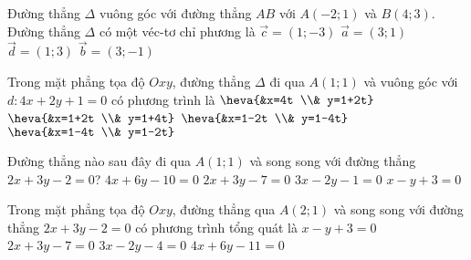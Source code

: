 	\begin{ex}%
		Đường thẳng $\Delta$ vuông góc với đường thẳng $AB$ với $A(-2;1)$ và $B(4;3)$. Đường thẳng $\Delta$ có một véc-tơ chỉ phương là
		\choice
		{\True $\overrightarrow{c}=(1;-3)$}
		{$\overrightarrow{a}=(3;1)$}
		{$\overrightarrow{d}=(1;3)$}
		{$\overrightarrow{b}=(3;-1)$}
	\end{ex}
	\begin{ex}%
		Trong mặt phẳng tọa độ $Oxy$, đường thẳng $\Delta$ đi qua $A(1;1)$ và vuông góc với $d \colon 4x+2y+1=0$ có phương trình là
		\choice
		{$\heva{&x=4t \\& y=1+2t}$}
		{$\heva{&x=1+2t \\& y=1+4t}$}
		{$\heva{&x=1-2t \\& y=1-4t}$}
		{\True $\heva{&x=1-4t \\& y=1-2t}$}
	\end{ex}
	\begin{ex}%
		Đường thẳng nào sau đây đi qua $A(1;1)$ và song song với đường thẳng $2x+3y-2=0$?
		\choice
		{\True $4x+6y-10=0$}
		{$2x+3y-7=0$}
		{$3x-2y-1=0$}
		{$x-y+3=0$}
	\end{ex}
	\begin{ex}%
		Trong mặt phẳng tọa độ $Oxy$, đường thẳng qua $A(2;1)$ và song song với đường thẳng $2x+3y-2=0$ có phương trình tổng quát là
		\choice
		{$x-y+3=0$}
		{\True $2x+3y-7=0$}
		{$3x-2y-4=0$}
		{$4x+6y-11=0$}
	\end{ex}
